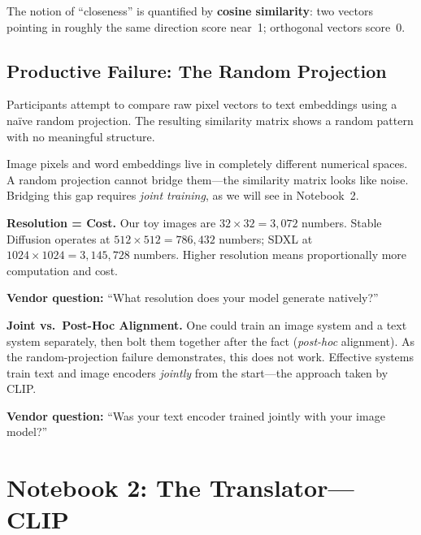 \documentclass[11pt,a4paper]{article}
\begin{document}
The notion of ``closeness'' is quantified by \textbf{cosine similarity}:
two vectors pointing in roughly the same direction score near~1;
orthogonal vectors score~0.

\subsection{Productive Failure: The Random Projection}

Participants attempt to compare raw pixel vectors to text embeddings
using a na\"ive random projection.  The resulting similarity matrix shows
a random pattern with no meaningful structure.

\begin{pitfall}
Image pixels and word embeddings live in completely different numerical
spaces.  A random projection cannot bridge them---the similarity matrix
looks like noise.  Bridging this gap requires \emph{joint training}, as
we will see in Notebook~2.
\end{pitfall}

\begin{managerbox}
\textbf{Resolution = Cost.}  Our toy images are $32 \times 32 = 3{,}072$
numbers.  Stable Diffusion operates at $512 \times 512 = 786{,}432$
numbers; SDXL at $1024 \times 1024 = 3{,}145{,}728$ numbers.  Higher
resolution means proportionally more computation and cost.

\textbf{Vendor question:} ``What resolution does your model generate
natively?''
\end{managerbox}

\begin{managerbox}
\textbf{Joint vs.\ Post-Hoc Alignment.}  One could train an image system
and a text system separately, then bolt them together after the fact
(\emph{post-hoc} alignment).  As the random-projection failure
demonstrates, this does not work.  Effective systems train text and image
encoders \emph{jointly} from the start---the approach taken by CLIP.

\textbf{Vendor question:} ``Was your text encoder trained jointly with
your image model?''
\end{managerbox}


\section{Notebook 2: The Translator---CLIP}
\label{sec:nb2}
\end{document}
